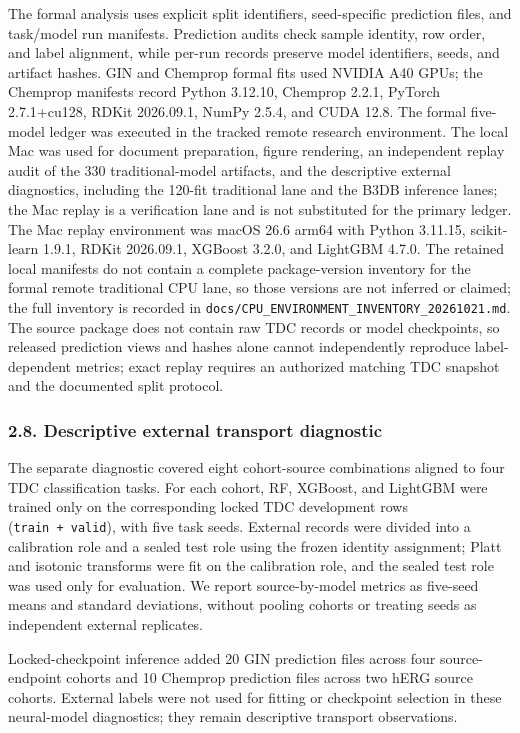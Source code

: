 \documentclass[
]{article}
\begin{document}
The formal analysis uses explicit split identifiers, seed-specific
prediction files, and task/model run manifests. Prediction audits check
sample identity, row order, and label alignment, while per-run records
preserve model identifiers, seeds, and artifact hashes. GIN and Chemprop
formal fits used NVIDIA A40 GPUs; the Chemprop manifests record Python
3.12.10, Chemprop 2.2.1, PyTorch 2.7.1+cu128, RDKit 2026.09.1, NumPy
2.5.4, and CUDA 12.8. The formal five-model ledger was executed in the
tracked remote research environment. The local Mac was used for document
preparation, figure rendering, an independent replay audit of the 330
traditional-model artifacts, and the descriptive external diagnostics,
including the 120-fit traditional lane and the B3DB inference lanes; the Mac
replay is a verification lane and is not substituted for the primary ledger.
The Mac replay
environment was macOS 26.6 arm64 with Python 3.11.15, scikit-learn
1.9.1, RDKit 2026.09.1, XGBoost 3.2.0, and LightGBM 4.7.0. The retained
local manifests do not contain a complete package-version inventory for
the formal remote traditional CPU lane, so those versions are not
inferred or claimed; the full inventory is recorded in
\texttt{docs/CPU\_ENVIRONMENT\_INVENTORY\_20261021.md}.
The source package does not contain raw TDC records or model
checkpoints, so released prediction views and hashes alone cannot
independently reproduce label-dependent metrics; exact replay requires
an authorized matching TDC snapshot and the documented split protocol.

\subsubsection{2.8. Descriptive external transport
diagnostic}\label{descriptive-external-transport-diagnostic}

The separate diagnostic covered eight cohort-source combinations aligned
to four TDC classification tasks. For each cohort, RF, XGBoost, and
LightGBM were trained only on the corresponding locked TDC development
rows (\texttt{train\ +\ valid}), with five task seeds. External records
were divided into a calibration role and a sealed test role using the
frozen identity assignment; Platt and isotonic transforms were fit on
the calibration role, and the sealed test role was used only for
evaluation. We report source-by-model metrics as five-seed means and
standard deviations, without pooling cohorts or treating seeds as
independent external replicates.

Locked-checkpoint inference added 20 GIN prediction files across four
source-endpoint cohorts and 10 Chemprop prediction files across two
hERG source cohorts. External labels were not used for fitting or
checkpoint selection in these neural-model diagnostics; they remain
descriptive transport observations.
\end{document}
